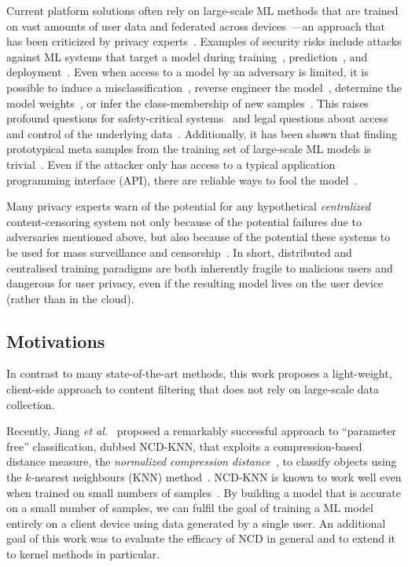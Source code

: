 \documentclass[preprint,12pt]{article}
\begin{document}
Current platform solutions often rely on large-scale ML methods that are trained on vast amounts of user data and federated across devices~\cite{apple_csam}---an approach that has been criticized by privacy experts~\cite{chat_control}.
Examples of security risks include attacks against ML systems that target a model during training~\cite{biggio_poisoning_2013}, prediction~\cite{biggio_evasion_2013,deepfool,carlini_towards_2017}, and deployment~\cite{distributed_attacks,santos2021universal}.
Even when access to a model by an adversary is limited, it is possible to induce a misclassification~\cite{hopskipjump}, reverse engineer the model~\cite{extraction_attack}, determine the model weights~\cite{jagielski2020high}, or infer the class-membership of new samples~\cite{bentley2020quantifying}.
This raises profound questions for safety-critical systems~\cite{meyers} and legal questions about access and control of the underlying data~\cite{mitrou2018data,marks2023ai}.
Additionally, it has been shown that finding prototypical meta samples from the training set of large-scale ML models is trivial~\cite{trashfire,meyers}.
Even if the attacker only has access to a typical application programming interface (API), there are reliable ways to fool the model~\cite{hopskipjump}.

Many privacy experts warn of the potential for any hypothetical \textit{centralized} content-censoring system not only because of the potential failures due to adversaries mentioned above, but also because of the potential these systems to be used for mass surveillance and censorship~\cite{chat_control}.
In short, distributed and centralised training paradigms are both inherently fragile to malicious users and dangerous for user privacy, even if the resulting model lives on the user device (rather than in the cloud).


\subsection{Motivations}

In contrast to many state-of-the-art methods, this work proposes a light-weight, client-side approach to content filtering that does not rely on large-scale data collection.

Recently, Jiang \textit{et al.}~\cite{jiang2022less} proposed a remarkably successful approach to ``parameter free'' classification, dubbed NCD-KNN, that exploits a compress\-ion-based distance measure, the \textit{normalized compression distance}~\citep[NCD;][]{ncd}, to classify objects using the $k$-nearest neighbours (KNN) method~\cite{shalev2014understanding}.
NCD-KNN is known to work well even when trained on small numbers of samples~\cite{scilipoti2024strong}.
By building a model that is accurate on a small number of samples, we can fulfil the goal of training a ML model entirely on a client device using data generated by a single user.
An additional goal of this work was to evaluate the efficacy of NCD in general and to extend it to kernel methods in particular.
\end{document}
